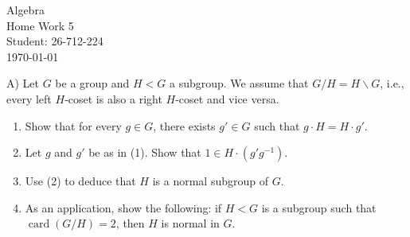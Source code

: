\documentclass[12pt,a4paper]{article}
\begin{document}
\begin{titlepage}
\centering
\vspace*{\fill}
{\Huge Algebra} \\[0.5cm]
{\Huge Home Work 5}\\[1.5cm]
{\Large Student: 26-712-224}\\[0.5cm]
{\Large \today}
\vspace*{\fill}
\end{titlepage}

\newpage
\noindent
A) Let $G$ be a group and $H<G$ a subgroup. We assume that $G/H=H\backslash G$, i.e., every left $H$-coset is also a right $H$-coset and vice versa.
\begin{enumerate}
\renewcommand{\labelenumi}{(\arabic{enumi})}
\item Show that for every $g\in G$, there exists $g'\in G$ such that $g\cdot H=H\cdot g'$.
\item Let $g$ and $g'$ be as in (1). Show that $1\in H\cdot(g'g^{-1})$.
\item Use (2) to deduce that $H$ is a normal subgroup of $G$.
\item As an application, show the following: if $H<G$ is a subgroup such that $\operatorname{card}(G/H)=2$, then $H$ is normal in $G$.
\end{enumerate}
\end{document}
